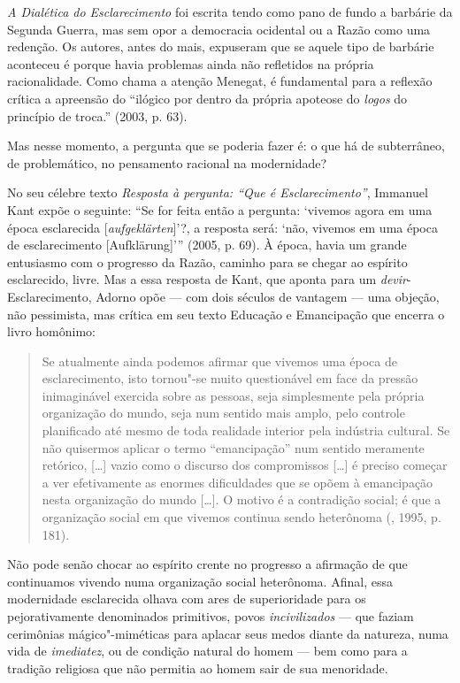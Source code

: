 \emph{A Dialética do Esclarecimento} foi escrita tendo como pano de
fundo a barbárie da Segunda Guerra, mas sem opor a democracia ocidental
ou a Razão como uma redenção. Os autores, antes do mais, expuseram que
se aquele tipo de barbárie aconteceu é porque havia problemas ainda não
refletidos na própria racionalidade. Como chama a atenção Menegat, é
fundamental para a reflexão crítica a apreensão do ``ilógico por dentro
da própria apoteose do \emph{logos} do princípio de troca.'' (2003, p.
63).

Mas nesse momento, a pergunta que se poderia fazer é: o que há de
subterrâneo, de problemático, no pensamento racional na modernidade?

No seu célebre texto \emph{Resposta à pergunta: ``Que é
Esclarecimento''}, Immanuel Kant expõe o seguinte: ``Se for feita então
a pergunta: `vivemos agora em uma época esclarecida
[\emph{aufgeklärten}]'?, a resposta será: `não, vivemos em uma época
de esclarecimento [Aufklärung]''' (2005, p. 69). À época,
havia um grande entusiasmo com o progresso da Razão, caminho para se
chegar ao espírito esclarecido, livre. Mas a essa resposta de Kant, que
aponta para um \emph{devir}-Esclarecimento, Adorno opõe --- com dois
séculos de vantagem --- uma objeção, não pessimista, mas crítica em seu
texto Educação e Emancipação que encerra o livro homônimo:

\begin{quote}
Se atualmente ainda podemos afirmar que vivemos uma época de
esclarecimento, isto tornou"-se muito questionável em face da pressão
inimaginável exercida sobre as pessoas, seja simplesmente pela própria
organização do mundo, seja num sentido mais amplo, pelo controle
planificado até mesmo de toda realidade interior pela indústria
cultural. Se não quisermos aplicar o termo ``emancipação'' num sentido
meramente retórico, [\ldots{}] vazio como o discurso dos compromissos
[\ldots{}] é preciso começar a ver efetivamente as enormes dificuldades
que se opõem à emancipação nesta organização do mundo [\ldots{}]. O
motivo é a contradição social; é que a organização social em que vivemos
continua sendo heterônoma (, 1995, p. 181).
\end{quote}

Não pode senão chocar ao espírito crente no progresso a afirmação de que
continuamos vivendo numa organização social heterônoma. Afinal, essa
modernidade esclarecida olhava com ares de superioridade para os
pejorativamente denominados primitivos, povos \emph{incivilizados} --- que
faziam cerimônias mágico"-miméticas para aplacar seus medos diante da
natureza, numa vida de \emph{imediatez}, ou de condição natural do
homem --- bem como para a tradição religiosa que não permitia ao homem sair
de sua menoridade.

